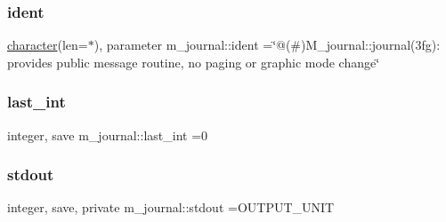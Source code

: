 \subsubsection{\texorpdfstring{ident}{ident}}
{\footnotesize\ttfamily \hyperlink{option__stopwatch_83_8txt_abd4b21fbbd175834027b5224bfe97e66}{character}(len=$\ast$), parameter m\+\_\+journal\+::ident =\char`\"{}@(\#)M\+\_\+journal\+::journal(3fg)\+: provides public message routine, no paging or graphic mode change\char`\"{}\hspace{0.3cm}{\ttfamily [private]}}

\mbox{\label{namespacem__journal_a47e8e34dc4072b04101027394d688519}} 
\subsubsection{\texorpdfstring{last\+\_\+int}{last\_int}}
{\footnotesize\ttfamily integer, save m\+\_\+journal\+::last\+\_\+int =0\hspace{0.3cm}{\ttfamily [private]}}

\mbox{\label{namespacem__journal_a664cf3fd85385b776d30ea589606ad1c}} 
\subsubsection{\texorpdfstring{stdout}{stdout}}
{\footnotesize\ttfamily integer, save, private m\+\_\+journal\+::stdout =O\+U\+T\+P\+U\+T\+\_\+\+U\+N\+IT\hspace{0.3cm}{\ttfamily [private]}}

